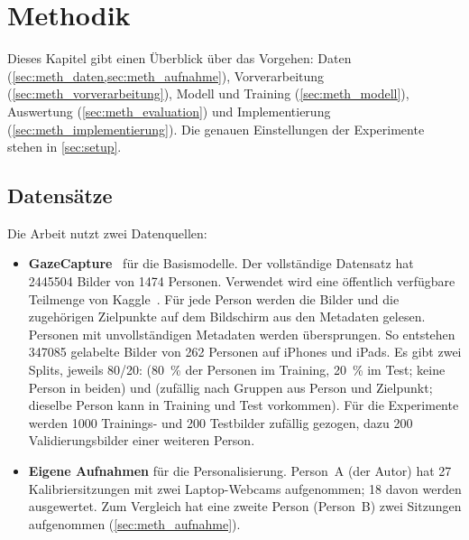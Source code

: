 \chapter{Methodik}
\label{ch:methodik}

Dieses Kapitel gibt einen Überblick über das Vorgehen: Daten
(\cref{sec:meth_daten,sec:meth_aufnahme}), Vorverarbeitung
(\cref{sec:meth_vorverarbeitung}), Modell und Training
(\cref{sec:meth_modell}), Auswertung (\cref{sec:meth_evaluation}) und
Implementierung (\cref{sec:meth_implementierung}). Die genauen Einstellungen
der Experimente stehen in \cref{sec:setup}.

\section{Datensätze}
\label{sec:meth_daten}
Die Arbeit nutzt zwei Datenquellen:
\begin{itemize}
  \item \textbf{GazeCapture}~\cite{krafka2016itracker} für die Basismodelle.
        Der vollständige Datensatz hat \num{2445504} Bilder von \num{1474}
        Personen. Verwendet wird eine öffentlich verfügbare Teilmenge von
        Kaggle~\cite{kaggle_gazecapture}. Für jede Person werden die Bilder
        und die zugehörigen Zielpunkte auf dem Bildschirm aus den Metadaten
        gelesen. Personen mit unvollständigen Metadaten werden übersprungen.
        So entstehen \num{347085} gelabelte Bilder von 262 Personen auf
        iPhones und iPads. Es gibt zwei Splits, jeweils 80/20:
         (\SI{80}{\percent} der Personen im Training,
        \SI{20}{\percent} im Test; keine Person in beiden) und
         (zufällig nach Gruppen aus Person und Zielpunkt;
        dieselbe Person kann in Training und Test vorkommen). Für die Experimente
        werden \num{1000} Trainings- und \num{200} Testbilder zufällig gezogen,
        dazu 200 Validierungsbilder einer weiteren Person.
  \item \textbf{Eigene Aufnahmen} für die Personalisierung. Person~A (der
        Autor) hat 27 Kalibriersitzungen mit zwei Laptop-Webcams aufgenommen;
        18 davon werden ausgewertet. Zum Vergleich hat eine zweite Person
        (Person~B) zwei Sitzungen aufgenommen (\cref{sec:meth_aufnahme}).
\end{itemize}

